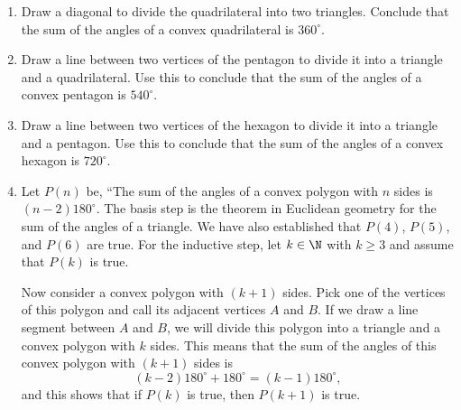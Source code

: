 \documentclass[11pt]{article}
\begin{document}
\begin{enumerate}
\item Draw a diagonal to divide the quadrilateral into two triangles.  Conclude that the sum of the angles of a convex quadrilateral is $360^\circ$.

\item Draw a line between two vertices of the pentagon to divide it into a triangle and a quadrilateral.  Use this to conclude that the sum of the angles of a convex pentagon is 
$540^\circ$.

\item Draw a line between two vertices of the hexagon to divide it into a triangle and a pentagon.  Use this to conclude that the sum of the angles of a convex hexagon is 
$720^\circ$.

\item Let $P(n)$ be, ``The sum of the angles of a convex polygon with $n$ sides is 
$(n - 2)180^\circ$.  The basis step is the theorem in Euclidean geometry for the sum of the angles of a triangle.  We have also established that $P(4)$, $P(5)$, and $P(6)$ are true.  For the inductive step, let $k \in \N$ with $k \geq 3$ and assume that $P(k)$ is true.

Now consider a convex polygon with $(k + 1)$ sides.  Pick one of the vertices of this polygon and call its adjacent vertices $A$ and $B$.  If we draw a line segment between $A$ and $B$, we will divide this polygon into a triangle and a convex polygon with $k$ sides.  This means that the sum of the angles of this convex polygon with $(k + 1)$ sides is
\[
(k - 2)180^\circ + 180^\circ = (k - 1) 180^\circ,
\]
and this shows that if $P(k)$ is true, then $P(k + 1)$ is true.
\end{enumerate}
\end{document}

